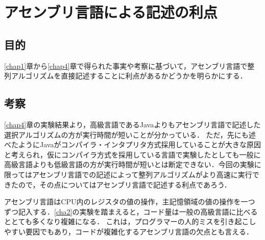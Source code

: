\chapter{アセンブリ言語による記述の利点}
\section{目的}
\ref{chap1}章から\ref{chap4}章で得られた事実や考察に基づいて，アセンブリ言語で整列アルゴリズムを直接記述することに利点があるかどうかを明らかにする．
\section{考察}
\ref{chap4}章の実験結果より，高級言語である{\ttfamily Java}よりもアセンブリ言語で記述した選択アルゴリズムの方が実行時間が短いことが分かっている．
ただ，先にも述べたように{\ttfamily Java}がコンパイラ・インタプリタ方式採用していることが大きな原因と考えられ，仮にコンパイラ方式を採用している言語で実験したとしても一般に高級言語よりも低級言語の方が実行時間が短いとは断定できない．今回の実験に限ってはアセンブリ言語での記述によって整列アルゴリズムがより高速に実行できたので，その点についてはアセンブリ言語で記述する利点であろう．\par
アセンブリ言語はCPU内のレジスタの値の操作，主記憶領域の値の操作を一つずつ記入する．\ref{cha2}の実験を踏まえると，コード量は一般の高級言語に比べるととても多くなり複雑になる．
これは，プログラマーの人的ミスを引き起こしやすい要因でもあり，コードが複雑化するアセンブリ言語の欠点とも言える．